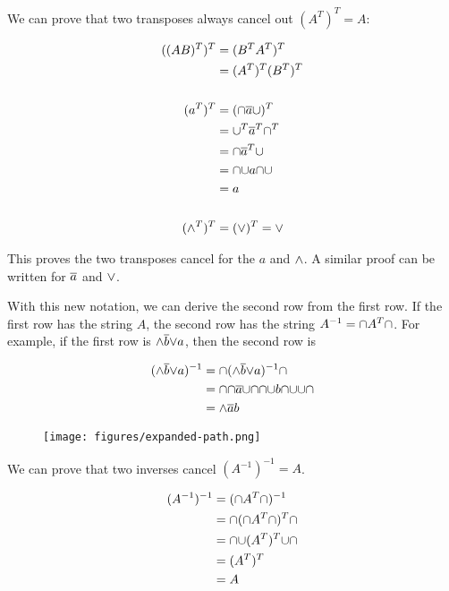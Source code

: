 \documentclass[acmtog]{acmart}
\begin{document}
We can prove that two transposes always cancel out $(A^T)^T = A$:

\begin{equation}
\begin{split}
((AB)^T)^T & = (B^T A^T)^T \\
           & = (A^T)^T (B^T)^T \\
& \\
(a^T)^T & = ({\cap} \overline{a} {\cup})^T \\
        & = {\cup}^T \overline{a}^T {\cap}^T \\
        & = {\cap} \overline{a}^T {\cup} \\
        & = {\cap} {\cup} a {\cap} {\cup} \\
        & = a \\
& \\
({\wedge}^T)^T & = ({\vee})^T = {\vee} \\
\end{split}
\end{equation}

This proves the two transposes cancel for the $a$ and ${\wedge}$. A similar proof can
be written for $\overline{a}$ and ${\vee}$.

With this new notation, we can derive the second row from the first row. If the
first row has the string $A$, the second row has the string
$A^{-1} = {\cap} A^T {\cap}$. For example, if the first row is ${\wedge} \overline{b} {\vee} a$,
then the second row is

\begin{equation}
\begin{split}
({\wedge} \overline{b} {\vee} a)^{-1} & = {\cap} ({\wedge} \overline{b} {\vee} a)^{-1} {\cap} \\
& = {\cap} {\cap} \overline{a} {\cup} {\cap} {\cap} {\cup} b {\cap} {\cup} {\cup} {\cap} \\
& = {\wedge} \overline{a} b \\
\end{split}
\end{equation}

\begin{figure}[H]
\centering
\texttt{[image: figures/expanded-path.png]}
\end{figure}

We can prove that two inverses cancel $(A^{-1})^{-1} = A$.

\begin{equation}
\begin{split}
(A^{-1})^{-1} & = ({\cap} A^T {\cap})^{-1} \\
              & = {\cap} ({\cap} A^T {\cap})^{T} {\cap} \\
              & = {\cap} {\cup} (A^T)^T {\cup} {\cap} \\
              & = (A^T)^T \\
              & = A \\
\end{split}
\end{equation}
\end{document}
